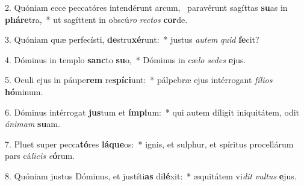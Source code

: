 2. Quóniam ecce peccatóres intendérunt arcum, \dag\  paravérunt sagíttas \textbf{su}as in \textbf{phá}\textbf{re}tra,~*  ut sagíttent in obscú\textit{ro} \textit{rec}\textit{tos} \textbf{cor}de.\

3. Quóniam quæ perfecísti, \textbf{de}stru\textbf{xé}runt:~*  justus \textit{au}\textit{tem} \textit{quid} \textbf{fe}cit?\

4. Dóminus in templo \textbf{sanc}to \textbf{su}o,~*  Dóminus in cæ\textit{lo} \textit{se}\textit{des} \textbf{e}jus.\

5. Oculi ejus in páupe\textbf{rem} re\textbf{spí}\textbf{ci}unt:~*  pálpebræ ejus intérrogant \textit{fí}\textit{li}\textit{os} \textbf{hó}minum.\

6. Dóminus intérrogat \textbf{jus}tum et \textbf{ím}\textbf{pi}um:~*  qui autem díligit iniquitátem, odit \textit{á}\textit{ni}\textit{mam} \textbf{su}am.\

7. Pluet super pecca\textbf{tó}res \textbf{lá}\textbf{que}os:~*  ignis, et sulphur, et spíritus procellárum pars cá\textit{li}\textit{cis} \textit{e}\textbf{ó}rum.\

8. Quóniam justus Dóminus, et justíti\textbf{as} di\textbf{lé}xit:~*  æquitátem vi\textit{dit} \textit{vul}\textit{tus} \textbf{e}jus.\

